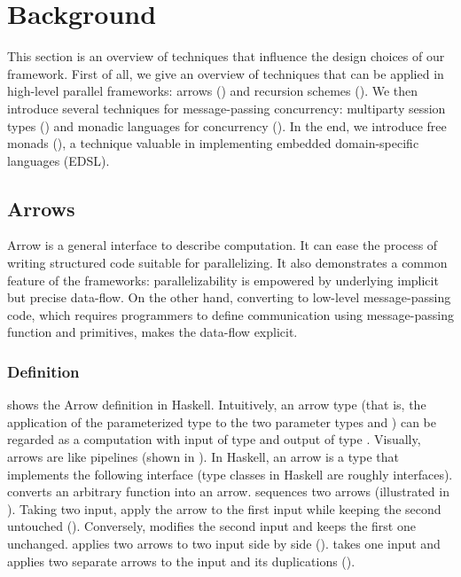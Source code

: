 \chapter{Background} \label{b} \label{chap:b}
This section is an overview of techniques that influence the design choices of our framework. First of all, we give an overview of techniques that can be applied in high-level parallel frameworks: arrows () and recursion schemes (). We then introduce several techniques for message-passing concurrency: multiparty session types () and monadic languages for concurrency (). In the end, we introduce free monads (), a technique valuable in implementing embedded domain-specific languages (EDSL).

\section{Arrows} \label{b:arrows}
Arrow is a general interface to describe computation. It can ease the process of writing structured code suitable for parallelizing. It also demonstrates a common feature of the frameworks: parallelizability is empowered by underlying implicit but precise data-flow. On the other hand, converting to low-level message-passing code, which requires programmers to define communication using message-passing function and primitives, makes the data-flow explicit.
\subsection{Definition}
 shows the Arrow definition in Haskell. Intuitively, an arrow type (that is, the application of the parameterized type  to the two parameter types  and ) can be regarded as a computation with input of type  and output of type \cite{hughesGeneralisingMonadsArrows2000}. Visually, arrows are like pipelines (shown in ). In Haskell, an arrow  is a type that implements the following interface (type classes in Haskell are roughly interfaces).  converts an arbitrary function into an arrow. \hask{>>>} sequences two arrows (illustrated in ). Taking two input,   apply the arrow to the first input while keeping the second untouched (). Conversely,  modifies the second input and keeps the first one unchanged. \hask{***} applies two arrows to two input side by side (). \hask{&&&} takes one input and applies two separate arrows to the input and its duplications ().

